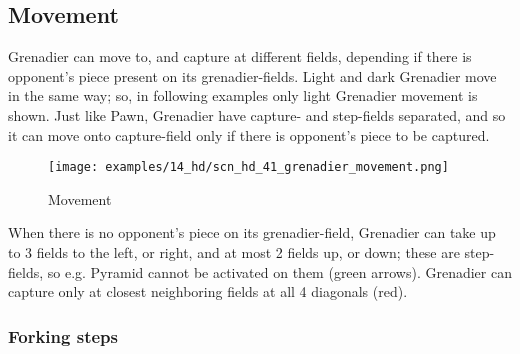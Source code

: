 \subsection*{Movement}
\label{sec:Hemera's Dawn/Grenadier/Movement}

\vspace*{-0.7\baselineskip}
Grenadier can move to, and capture at different fields, depending if there is
opponent's piece present on its grenadier-fields. Light and dark Grenadier move
in the same way; so, in following examples only light Grenadier movement is
shown. \newline
\indent
Just like Pawn, Grenadier have capture- and step-fields separated, and so it
can move onto capture-field only if there is opponent's piece to be captured.

\clearpage %

\vspace*{-2.3\baselineskip}
\noindent
\begin{figure}[!h]
\texttt{[image: examples/14\_hd/scn\_hd\_41\_grenadier\_movement.png]}
\vspace*{-1.3\baselineskip}
\caption{Movement}
\label{fig:scn_hd_41_grenadier_movement}
\end{figure}

\vspace*{-0.5\baselineskip}
When there is no opponent's piece on its grenadier-field, Grenadier can take up to 3
fields to the left, or right, and at most 2 fields up, or down; these are step-fields,
so e.g. Pyramid cannot be activated on them (green arrows). Grenadier can capture only
at closest neighboring fields at all 4 diagonals (red).

\vspace*{-0.7\baselineskip}
\subsubsection*{Forking steps}
\label{sec:Hemera's Dawn/Grenadier/Movement/Forking steps}

